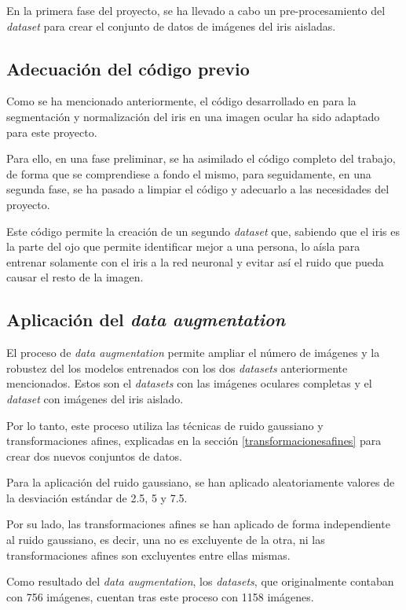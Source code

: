 En la primera fase del proyecto, se ha llevado a cabo un pre-procesamiento del \textit{dataset} para crear el conjunto de datos de imágenes del iris aisladas.

\subsection{Adecuación del código previo}

Como se ha mencionado anteriormente, el código desarrollado en \cite{tfg_iris_2020} para la segmentación y normalización del iris en una imagen ocular ha sido adaptado para este proyecto. 

Para ello, en una fase preliminar, se ha asimilado el código completo del trabajo, de forma que se comprendiese a fondo el mismo, para seguidamente, en una segunda fase, se ha pasado a limpiar el código y adecuarlo a las necesidades del proyecto. 

Este código permite la creación de un segundo \textit{dataset} que, sabiendo que el iris es la parte del ojo que permite identificar mejor a una persona, lo aísla para entrenar solamente con el iris a la red neuronal y evitar así el ruido que pueda causar el resto de la imagen. 

\subsection{Aplicación del \textit{data augmentation}}

El proceso de \textit{data augmentation} permite ampliar el número de imágenes y la robustez del los modelos entrenados con los dos \textit{datasets} anteriormente mencionados. Estos son el \textit{datasets} con las imágenes oculares completas y el \textit{dataset} con imágenes del iris aislado. 

Por lo tanto, este proceso utiliza las técnicas de ruido gaussiano y transformaciones afines, explicadas en la sección \ref{transformacionesafines} para crear dos nuevos conjuntos de datos. 

Para la aplicación del ruido gaussiano, se han aplicado aleatoriamente valores de la desviación estándar de 2.5, 5 y 7.5.

Por su lado, las transformaciones afines se han aplicado de forma independiente al ruido gaussiano, es decir, una no es excluyente de la otra, ni las transformaciones afines son excluyentes entre ellas mismas. 

Como resultado del \textit{data augmentation}, los \textit{datasets}, que originalmente contaban con 756 imágenes, cuentan tras este proceso con 1158 imágenes.

